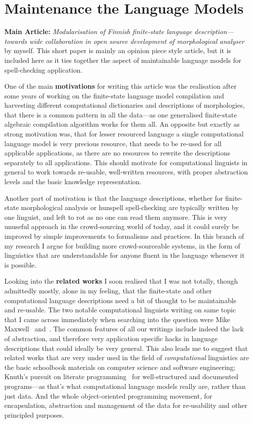 \documentclass[officiallayout,draft]{unihelcompling}
\begin{document}
\section{Maintenance the Language Models}

\textbf{Main Article:} \emph{Modularisation of Finnish finite-state language 
description—towards wide collaboration in open source development of
morphological analyser} by myself. This short paper is mainly an opinion
piece style article, but it is included here as it ties together the
aspect of maintainable language models for spell-checking application.

One of the main \textbf{motivations} for writing this article was the
realisation after some years of working on the finite-state language model
compilation and harvesting different computational dictionaries and
descriptions of morphologies, that there is a common pattern in all the 
data---as one generalised finite-state algebraic compilation algorithm works
for them all. An opposite but exactly as strong motivation was, that for
lesser resourced language a single computational language model is very
precious resource, that needs to be re-used for all applicable applications,
as there are no resources to rewrite the descriptions separately to all 
applications. This should motivate for computational linguists in general to
work towards re-usable, well-written resources, with proper abstraction levels
and the basic knowledge representation.

Another part of motivation is that the language descriptions, whether for
finite-state morphological analysis or hunspell spell-checking are typically
written by one linguist, and left to rot as no one can read them anymore.
This is very unuseful approach in the crowd-sourcing world of today, and it
could surely be improved by simple improvements to formalisms and practices.
In this branch of my research I argue for building more crowd-sourceable 
systems, in the form of linguistics that are understandable for anyone
fluent in the language whenever it is possible.

Looking into the \textbf{related works} I soon realised that I was not totally,
though admittedly mostly, alone in my feeling, that the finite-state and other
computational language descriptions need a bit of thought to be maintainable
and re-usable. The two notable computational linguists writing on same topic
that I came across immediately when searching into the question were Mike
Maxwell~\cite{maxwell2008joint} and~\cite{wintner2008strengths}. The common
features of all our writings include indeed the lack of abstraction, and
therefore very application specific hacks in language descriptions that could
ideally be very general. This also leads me to suggest that related works that
are very under used in the field of \emph{computational} linguistics are the
basic schoolbook materials on computer science and software engineering;
Knuth's pursuit on literate programming~\cite{knuth1992literate} for
well-structured and documented programs---as that's what computational language
models really are, rather than just data. And the whole object-oriented
programming movement, for encapsulation, abstraction and management of the data
for re-usability and other principled purposes.
\end{document}

